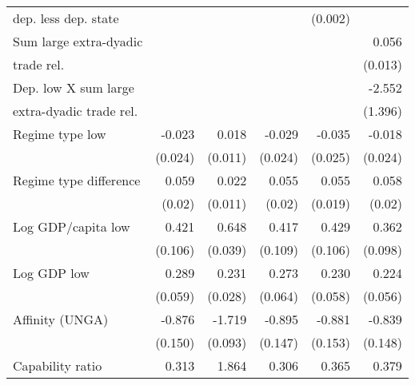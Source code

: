 \begin{table}[htbp]
\begin{tabular}{l*{5}{D{.}{.}{-1}}}
dep. less dep. state   &                     &                     &                     &   (0.002)         &                     \\
\addlinespace
Sum large extra-dyadic&                     &                     &                     &                     &      0.056\sym{***}\\
 trade rel.  &                     &                     &                     &                     &    (0.013)         \\
\addlinespace
Dep. low X sum large &                     &                     &                     &                     &      -2.552\sym{+}  \\
  extra-dyadic trade rel. &                     &                     &                     &                     &     (1.396)         \\
\addlinespace
Regime type low&     -0.023         &      0.018         &     -0.029         &     -0.035         &     -0.018         \\
   &    (0.024)         &    (0.011)         &    (0.024)         &    (0.025)         &    (0.024)         \\
\addlinespace
Regime type difference&      0.059\sym{**} &      0.022\sym{*}  &      0.055\sym{**} &      0.055\sym{**} &      0.058\sym{**} \\
   &    (0.02)         &    (0.011)         &    (0.02)         &    (0.019)         &    (0.02)         \\
\addlinespace
Log GDP/capita low&       0.421\sym{***}&       0.648\sym{***}&       0.417\sym{***}&       0.429\sym{***}&       0.362\sym{***}\\
   &     (0.106)         &    (0.039)         &     (0.109)         &     (0.106)         &    (0.098)         \\
\addlinespace
Log GDP low&       0.289\sym{***}&       0.231\sym{***}&       0.273\sym{***}&       0.230\sym{***}&       0.224\sym{***}\\
   &    (0.059)         &    (0.028)         &    (0.064)         &    (0.058)         &    (0.056)         \\
\addlinespace
Affinity (UNGA)&      -0.876\sym{***}&      -1.719\sym{***}&      -0.895\sym{***}&      -0.881\sym{***}&      -0.839\sym{***}\\
   &     (0.150)         &    (0.093)         &     (0.147)         &     (0.153)         &     (0.148)         \\
\addlinespace
Capability ratio&       0.313         &       1.864\sym{***}&       0.306         &       0.365         &       0.379         \\

\end{tabular}
\end{table}
